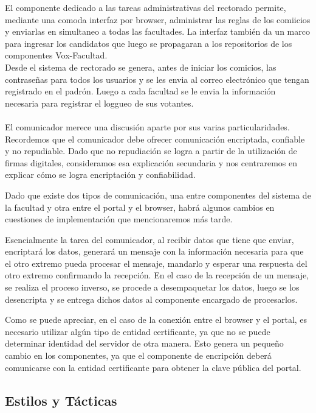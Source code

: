 El componente dedicado a las tareas administrativas del rectorado permite, mediante una comoda interfaz por browser, administrar las reglas de los comiicios y enviarlas en simultaneo a todas las facultades. La interfaz también da un marco para ingresar los candidatos que luego se propagaran a los repositorios de los componentes Vox-Facultad.
\\
Desde el sistema de rectorado se genera, antes de iniciar los comicios, las contraseñas para todos los usuarios y se les envia al correo electrónico que tengan registrado en el padrón. Luego a cada facultad se le envia la información necesaria para registrar el loggueo de sus votantes.
\\
\\
El comunicador merece una discusión aparte por sus varias particularidades. Recordemos que el comunicador debe ofrecer comunicación encriptada, confiable y no repudiable. Dado que no repudiación se logra a partir de la utilización de firmas digitales, consideramos esa explicación secundaria y nos centraremos en explicar cómo se logra encriptación y confiabilidad.

Dado que existe dos tipos de comunicación, una entre componentes del sistema de la facultad y otra entre el portal y el browser, habrá algunos cambios en cuestiones de implementación que mencionaremos más tarde.

Esencialmente la tarea del comunicador, al recibir datos que tiene que enviar, encriptará los datos, generará un mensaje con la información necesaria para que el otro extremo pueda procesar el mensaje, mandarlo y esperar una respuesta del otro extremo confirmando la recepción.
En el caso de la recepción de un mensaje, se realiza el proceso inverso, se procede a desempaquetar los datos, luego se los desencripta y se entrega dichos datos al componente encargado de procesarlos.

Como se puede apreciar, en el caso de la conexión entre el browser y el portal, es necesario utilizar algún tipo de entidad certificante, ya que no se puede determinar identidad del servidor de otra manera. Esto genera un pequeño cambio en los componentes, ya que el componente de encripción deberá comunicarse con la entidad certificante para obtener la clave pública del portal.




\subsection{Estilos y Tácticas}

